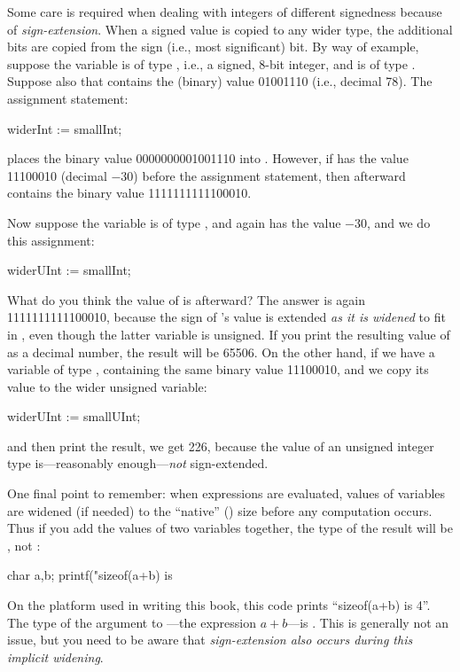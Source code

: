 Some care is required when dealing with integers of different
signedness because of \emph{sign-extension}.  When a signed value is
copied to any wider type, the
additional bits are copied from the sign (i.e., most significant)
bit.  By way of example, suppose the variable  is of type
, i.e., a signed, 8-bit integer, and  is
of type .  Suppose also that  contains the
(binary) value 01001110 (i.e., decimal 78).
The assignment statement:
\begin{inlinecode}
    widerInt := smallInt;
\end{inlinecode}
places the binary value 0000000001001110 into .
However, if  has the value 11100010 (decimal $-30$)
before the assignment
statement, then afterward  contains the binary value
1111111111100010.

Now suppose the variable  is of type ,
and  again has the value $-30$, and we do this assignment:
\begin{inlinecode}
    widerUInt := smallInt;
\end{inlinecode}
What do you think the value of  is afterward?
The answer is again 1111111111100010, because the sign of 's
value is extended \emph{as it is widened} to fit in ,
even though the latter variable is unsigned.  If you
print the resulting value of  as a decimal number,
the result will be 65506.
On the other hand, if we have a variable  of type
, containing the same binary value 11100010,
and we copy its value to the wider unsigned variable:
\begin{inlinecode}
   widerUInt := smallUInt;
\end{inlinecode}
and then print the result, we get 226, because the value of an unsigned
integer type is---reasonably enough---\emph{not\/} sign-extended.

One final point to remember: when expressions are evaluated, values of
variables are widened (if needed) to the ``native''
() size before any computation occurs.
Thus if you add the values of two 
variables together, the type of the result will be , not
:
\begin{inlinecode}
   char a,b;
   printf("sizeof(a+b) is %
\end{inlinecode}
On the platform used in writing this book, this code prints
``sizeof(a+b) is 4''.  The type of the argument to
---the expression $a+b$---is .
%
This is generally not an issue, but you need to be aware that
\emph{sign-extension also occurs during this implicit
widening}.

